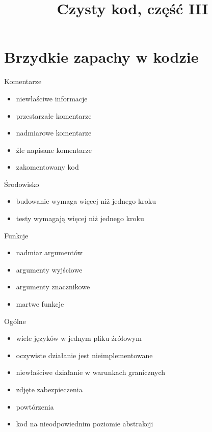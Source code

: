 

\title{Czysty kod, część III}



\section{Brzydkie zapachy w kodzie}

\begin{frame}{Komentarze}
\begin{itemize}
	\item niewłaściwe informacje
	\item przestarzałe komentarze
	\item nadmiarowe komentarze
	\item źle napisane komentarze
	\item zakomentowany kod
\end{itemize}
\end{frame}

\begin{frame}{Środowisko}
\begin{itemize}
	\item budowanie wymaga więcej niż jednego kroku
	\item testy wymagają więcej niż jednego kroku
\end{itemize}
\end{frame}

\begin{frame}{Funkcje}
\begin{itemize}
	\item nadmiar argumentów
	\item argumenty wyjściowe
	\item argumenty znacznikowe
	\item martwe funkcje
\end{itemize}
\end{frame}

\begin{frame}{Ogólne}
\begin{itemize}
	\item wiele języków w jednym pliku źrółowym
	\item oczywiste działanie jest nieimplementowane
	\item niewłaściwe działanie w warunkach granicznych
	\item zdjęte zabezpieczenia
	\item powtórzenia
	\item kod na nieodpowiednim poziomie abstrakcji
\end{itemize}
\end{frame}

